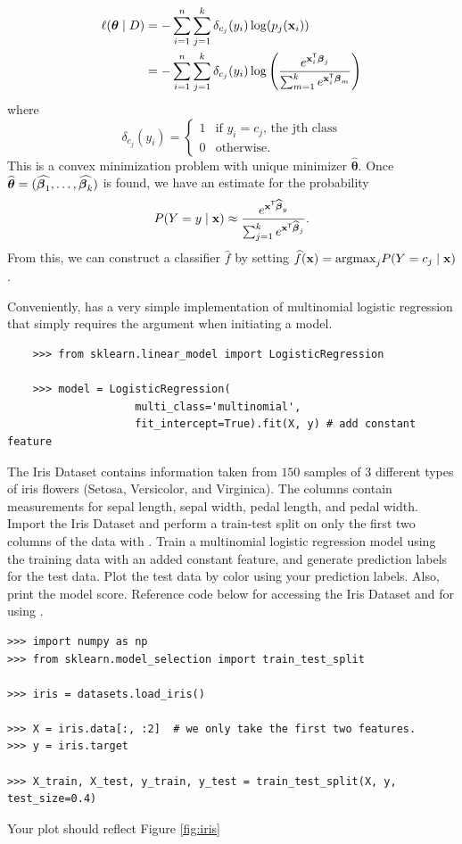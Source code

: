 \begin{align*}
    \ell(\boldsymbol{\theta}\mid D) 
    & = - \sum_{i=1}^n \sum_{j = 1}^k \delta_{c_j} (y_i) \log (p_j(\mathbf{x}_i)) \\
    & = - \sum_{i=1}^n \sum_{j = 1}^k \delta_{c_j} (y_i) \log \left(  \frac{e^{\mathbf{x}_i^\mathsf{T}\boldsymbol\beta_j}}{\sum_{m=1}^k e^{\mathbf{x}_i^\mathsf{T}\boldsymbol\beta_m}} \right)
\end{align*}
where 
\[
    \delta_{c_j} (y_i) = \begin{cases}
    1 & \text{if $y_i = c_j$, the jth class}\\
    0 & \text{otherwise}. 
    \end{cases}
\]
This is a convex minimization problem with unique minimizer $\widehat{\boldsymbol{\theta}}$.
Once $\widehat{\boldsymbol{\theta}} = (\widehat{\boldsymbol\beta_1},\dots, \widehat{\boldsymbol\beta_k})$ is found, we have an estimate for the probability
\[
    P(Y=y \mid \mathbf{x}) \approx \frac{e^{\mathbf{x}^\mathsf{T} \widehat{\boldsymbol\beta}_y}}{\sum_{j=1}^k e^{\mathbf{x}^\mathsf{T} \widehat{\boldsymbol\beta}_j}}.
\]
From this, we can construct a classifier $\widehat{f}$ by setting $\widehat{f}(\mathbf{x}) = \text{argmax}_j P(Y=c_j \mid \mathbf{x}) $.  

Conveniently,  has a very simple implementation of multinomial logistic regression that simply requires the argument  when initiating a  model.
\begin{lstlisting}
    >>> from sklearn.linear_model import LogisticRegression

    >>> model = LogisticRegression(
                    multi_class='multinomial',
                    fit_intercept=True).fit(X, y) # add constant feature
\end{lstlisting}


\begin{problem}
    The Iris Dataset contains information taken from $150$ samples of $3$ different types of iris flowers (Setosa, Versicolor, and Virginica).
    The columns contain measurements for sepal length, sepal width, pedal length, and pedal width.
    Import the Iris Dataset and perform a train-test split on only the first two columns of the data with .
    Train a multinomial logistic regression model using the training data with an added constant feature, and generate prediction labels for the test data.
    Plot the test data by color using your prediction labels. Also, print the model score.
    Reference code below for accessing the Iris Dataset and for using .
\begin{lstlisting}
>>> import numpy as np
>>> from sklearn.model_selection import train_test_split

>>> iris = datasets.load_iris()

>>> X = iris.data[:, :2]  # we only take the first two features.
>>> y = iris.target

>>> X_train, X_test, y_train, y_test = train_test_split(X, y, test_size=0.4)
\end{lstlisting}
    Your plot should reflect Figure \ref{fig:iris}
\end{problem}


